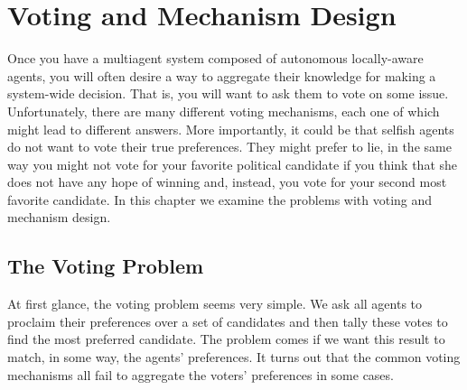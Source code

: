 \chapter{Voting and Mechanism Design}

Once you have a multiagent system composed of autonomous locally-aware
agents, you will often desire a way to aggregate their knowledge for
making a system-wide decision. That is, you will want to ask them to
vote on some issue. Unfortunately, there are many different voting
mechanisms, each one of which might lead to different answers. More
importantly, it could be that selfish agents do not want to vote their
true preferences. They might prefer to lie, in the same way you might
not vote for your favorite political candidate if you think that she
does not have any hope of winning and, instead, you vote for your
second most favorite candidate. In this chapter we examine the
problems with voting and mechanism design.

\section{The Voting Problem}
\label{sec:voting-problem}

At first glance, the voting problem seems very simple. We ask all
agents to proclaim their preferences over a set of candidates and then
tally these votes to find the most preferred candidate.  The problem
comes if we want this result to match, in some way, the agents'
preferences. It turns out that the common voting mechanisms all fail
to aggregate the voters' preferences in some cases.

